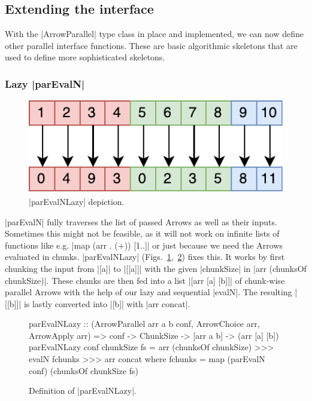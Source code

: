 \subsection{Extending the interface}
\label{sec:extending-interface}
With the |ArrowParallel| type class in place and implemented, we can now define other parallel interface functions. These are basic algorithmic skeletons that are used to define more sophisticated  skeletons.

\subsubsection{Lazy |parEvalN|}
\begin{figure}[tb]
	\includegraphics[scale=0.7]{images/parEvalNLazy}
	\caption{|parEvalNLazy| depiction.}
	\label{fig:parEvalNLazyImg}
\end{figure}
|parEvalN| fully traverses the list of passed Arrows as well as their inputs. Sometimes this might not be feasible, as it will not work on infinite lists of functions like e.g. |map (arr . (+)) [1..]| or just because we need the Arrows evaluated in chunks. |parEvalNLazy| (Figs.~\ref{fig:parEvalNLazyImg},~\ref{fig:parEvalNLazy}) fixes this. It works by first chunking the input from |[a]| to |[[a]]| with the given |chunkSize| in |arr (chunksOf chunkSize)|. These chunks are then fed into a list |[arr [a] [b]]| of chunk-wise parallel Arrows with the help of our lazy and sequential |evalN|. The resulting |[[b]]| is lastly converted into |[b]| with |arr concat|.
\begin{figure}[t]
\begin{code}
parEvalNLazy :: (ArrowParallel arr a b conf, ArrowChoice arr, ArrowApply arr) =>
	conf -> ChunkSize -> [arr a b] -> (arr [a] [b])
parEvalNLazy conf chunkSize fs =
	arr (chunksOf chunkSize) >>>
    evalN fchunks >>>
    arr concat
    where
      fchunks = map (parEvalN conf) (chunksOf chunkSize fs)
\end{code} %
\caption{Definition of |parEvalNLazy|.}
\label{fig:parEvalNLazy}
\end{figure}

